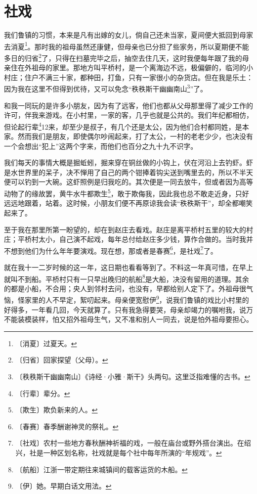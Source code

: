 \documentclass[12pt,UTF-8,openany]{ctexbook}
\begin{document}
\chapter{社戏}

\begin{normalsize}
    
    我们鲁镇的习惯，本来是凡有出嫁的女儿，倘自己还未当家，夏间便大抵回到母家去消夏\footnote{〔消夏〕过夏天。}。那时我的祖母虽然还康健，但母亲也已分担了些家务，所以夏期便不能多日的归省\footnote{〔归省〕回家探望（父母）。}了，只得在扫墓完毕之后，抽空去住几天，这时我便每年跟了我的母亲住在外祖母的家里。那地方叫平桥村，是一个离海边不远，极偏僻的，临河的小村庄；住户不满三十家，都种田，打鱼，只有一家很小的杂货店。但在我是乐土：因为我在这里不但得到优待，又可以免念“秩秩斯干幽幽南山\footnote{〔秩秩斯干幽幽南山〕《诗经·小雅·斯干》头两句。这里泛指难懂的古书。}”了。
    
    和我一同玩的是许多小朋友，因为有了远客，他们也都从父母那里得了减少工作的许可，伴我来游戏。在小村里，一家的客，几乎也就是公共的。我们年纪都相仿，但论起行辈\footnote{〔行辈〕辈分。}12来，却至少是叔子，有几个还是太公，因为他们合村都同姓，是本家。然而我们是朋友，即使偶尔吵闹起来，打了太公，一村的老老少少，也决没有一个会想出“犯上”这两个字来，而他们也百分之九十九不识字。
    
    我们每天的事情大概是掘蚯蚓，掘来穿在铜丝做的小钩上，伏在河沿上去钓虾。虾是水世界里的呆子，决不惮用了自己的两个钳捧着钩尖送到嘴里去的，所以不半天便可以钓到一大碗。这虾照例是归我吃的。其次便是一同去放牛，但或者因为高等动物了的缘故罢，黄牛水牛都欺生\footnote{〔欺生〕欺负新来的人。}，敢于欺侮我，因此我也总不敢走近身，只好远远地跟着，站着。这时候，小朋友们便不再原谅我会读“秩秩斯干”，却全都嘲笑起来了。
    
    至于我在那里所第一盼望的，却在到赵庄去看戏。赵庄是离平桥村五里的较大的村庄；平桥村太小，自己演不起戏，每年总付给赵庄多少钱，算作合做的。当时我并不想到他们为什么年年要演戏。现在想，那或者是春赛\footnote{〔春赛〕春季酬谢神灵的祭礼。}，是社戏\footnote{〔社戏〕农村一些地方春秋酬神祈福的戏，一般在庙台或野外搭台演出。在绍兴，社是一种区划名称，社戏就是每个社中每年所演的“年规戏”。}了。
    
    就在我十一二岁时候的这一年，这日期也看看等到了。不料这一年真可惜，在早上就叫不到船。平桥村只有一只早出晚归的航船\footnote{〔航船〕江浙一带定期往来城镇间的载客运货的木船。}是大船，决没有留用的道理。其余的都是小船，不合用；央人到邻村去问，也没有，早都给别人定下了。外祖母很气恼，怪家里的人不早定，絮叨起来。母亲便宽慰伊\footnote{〔伊〕她。早期白话文用法。}，说我们鲁镇的戏比小村里的好得多，一年看几回，今天就算了。只有我急得要哭，母亲却竭力的嘱咐我，说万不能装模装样，怕又招外祖母生气，又不准和别人一同去，说是怕外祖母要担心。
    

\end{normalsize}
\end{document}
